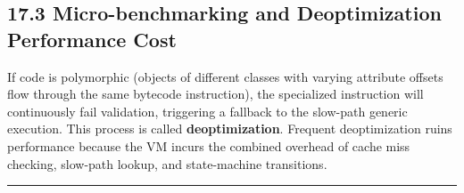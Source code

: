 \hypertarget{micro-benchmarking-and-deoptimization-performance-cost}{%
\subsection{17.3 Micro-benchmarking and Deoptimization Performance
Cost}\label{micro-benchmarking-and-deoptimization-performance-cost}}

If code is polymorphic (objects of different classes with varying
attribute offsets flow through the same bytecode instruction), the
specialized instruction will continuously fail validation, triggering a
fallback to the slow-path generic execution. This process is called
\textbf{deoptimization}. Frequent deoptimization ruins performance
because the VM incurs the combined overhead of cache miss checking,
slow-path lookup, and state-machine transitions.

\begin{center}\rule{0.5\linewidth}{0.5pt}\end{center}
